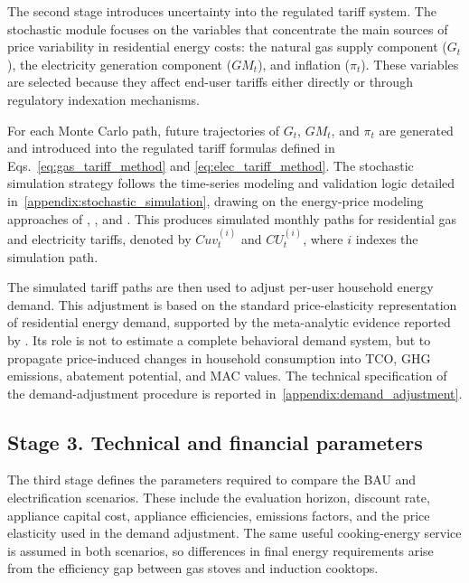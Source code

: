 \documentclass[authoryear,preprint,review,10pt]{elsarticle}
\begin{document}
The second stage introduces uncertainty into the regulated tariff system. The stochastic module focuses on the variables that concentrate the main sources of price variability in residential energy costs: the natural gas supply component ($G_t$), the electricity generation component ($GM_t$), and inflation ($\pi_t$). These variables are selected because they affect end-user tariffs either directly or through regulatory indexation mechanisms.

For each Monte Carlo path, future trajectories of $G_t$, $GM_t$, and $\pi_t$ are generated and introduced into the regulated tariff formulas defined in Eqs.~\eqref{eq:gas_tariff_method} and \eqref{eq:elec_tariff_method}. The stochastic simulation strategy follows the time-series modeling and validation logic detailed in~\ref{appendix:stochastic_simulation}, drawing on the energy-price modeling approaches of \citet{lucia2002electricity}, \citet{tan2010day}, and \citet{ibrahim2021geometric}. This produces simulated monthly paths for residential gas and electricity tariffs, denoted by $Cuv_t^{(i)}$ and $CU_t^{(i)}$, where $i$ indexes the simulation path.

The simulated tariff paths are then used to adjust per-user household energy demand. This adjustment is based on the standard price-elasticity representation of residential energy demand, supported by the meta-analytic evidence reported by \citet{espey2004turning}. Its role is not to estimate a complete behavioral demand system, but to propagate price-induced changes in household consumption into TCO, GHG emissions, abatement potential, and MAC values. The technical specification of the demand-adjustment procedure is reported in~\ref{appendix:demand_adjustment}.

\subsection{Stage 3. Technical and financial parameters}
\label{sec:parameter_selection}

The third stage defines the parameters required to compare the BAU and electrification scenarios. These include the evaluation horizon, discount rate, appliance capital cost, appliance efficiencies, emissions factors, and the price elasticity used in the demand adjustment. The same useful cooking-energy service is assumed in both scenarios, so differences in final energy requirements arise from the efficiency gap between gas stoves and induction cooktops.
\end{document}
